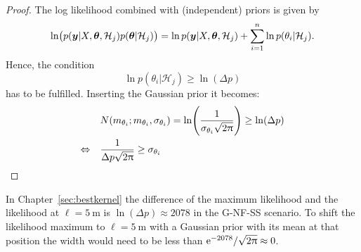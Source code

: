 \begin{proof}
    The log likelihood combined with (independent) priors is given by
    \begin{equation*}
        \ln\!\del{p(\vc y | X, \vc \theta, \mathcal{H}_j) p(\vc \theta 
            | \mathcal{H}_j)} = \ln p(\vc y | X, \vc \theta, \mathcal{H}_j) 
        + \sum_{i = 1}^n \ln p(\theta_i | \mathcal{H}_j) \text{.}
    \end{equation*}
    Hence, the condition
    \begin{equation*}
        \ln p(\theta_i | \mathcal{H}_j) \geq \ln(\Delta p)
    \end{equation*}
    has to be fulfilled. Inserting the Gaussian prior it becomes:
    \begin{align*}
        &N(m_{\theta_i}; m_{\theta_i}, \sigma_{\theta_i}) 
        = \ln\!\del{\frac{1}{\sigma_{\theta_i} \sqrt{2\uppi}}} \geq \ln(\Delta 
        p) \\
        \Leftrightarrow\quad & \frac{1}{\Delta p\sqrt{2\uppi}} \geq 
        \sigma_{\theta_i}
    \end{align*}
\end{proof}

In Chapter~\ref{sec:bestkernel} the difference of the maximum likelihood and the 
likelihood at $\ell = \SI{5}{\meter}$ is $\ln(\Delta p) \approx 2078$ in the 
G-NF-SS scenario. To shift the likelihood maximum to $\ell = \SI{5}{\meter}$ 
with a Gaussian prior with its mean at that position the width would need to be 
less than $\mathrm{e}^{-2078} / \sqrt{2\uppi} \approx 0$.
